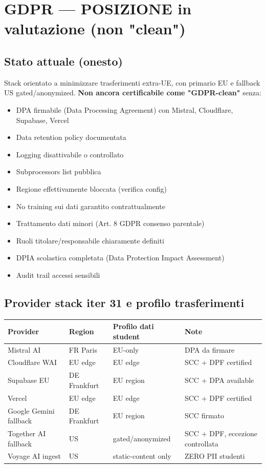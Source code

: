 \documentclass[12pt,a4paper]{article}
\begin{document}
\section{GDPR --- POSIZIONE in valutazione (non "clean")}

\subsection*{Stato attuale (onesto)}

Stack orientato a minimizzare trasferimenti extra-UE, con primario EU e fallback US gated/anonymized. \textbf{Non ancora certificabile come "GDPR-clean"} senza:

\begin{itemize}[leftmargin=*]
  \item DPA firmabile (Data Processing Agreement) con Mistral, Cloudflare, Supabase, Vercel
  \item Data retention policy documentata
  \item Logging disattivabile o controllato
  \item Subprocessors list pubblica
  \item Regione effettivamente bloccata (verifica config)
  \item No training sui dati garantito contrattualmente
  \item Trattamento dati minori (Art. 8 GDPR consenso parentale)
  \item Ruoli titolare/responsabile chiaramente definiti
  \item DPIA scolastica completata (Data Protection Impact Assessment)
  \item Audit trail accessi sensibili
\end{itemize}

\subsection*{Provider stack iter 31 e profilo trasferimenti}

\begin{center}
\begin{tabular}{llll}
\toprule
\textbf{Provider} & \textbf{Region} & \textbf{Profilo dati student} & \textbf{Note} \\
\midrule
Mistral AI            & FR Paris       & EU-only            & DPA da firmare \\
Cloudflare WAI        & EU edge        & EU edge            & SCC + DPF certified \\
Supabase EU           & DE Frankfurt   & EU region          & SCC + DPA available \\
Vercel                & EU edge        & EU edge            & SCC + DPF certified \\
Google Gemini fallback& DE Frankfurt   & EU region          & SCC firmato \\
\hline
Together AI fallback  & US             & gated/anonymized   & SCC + DPF, eccezione controllata \\
Voyage AI ingest      & US             & static-content only & ZERO PII studenti \\
\bottomrule
\end{tabular}
\end{center}
\end{document}
